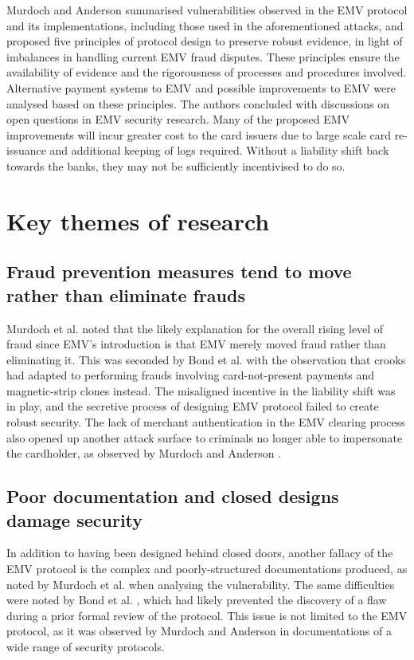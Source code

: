 \documentclass[11pt]{article}
\begin{document}
Murdoch and Anderson \cite{murdoch2014security} summarised vulnerabilities observed in the EMV protocol and its implementations, including those used in the aforementioned attacks, and proposed five principles of protocol design to preserve robust evidence, in light of imbalances in handling current EMV fraud disputes. These principles ensure the availability of evidence and the rigorousness of processes and procedures involved. Alternative payment systems to EMV and possible improvements to EMV were analysed based on these principles. The authors concluded with discussions on open questions in EMV security research. Many of the proposed EMV improvements will incur greater cost to the card issuers due to large scale card re-issuance and additional keeping of logs required. Without a liability shift back towards the banks, they may not be sufficiently incentivised to do so. 

\section{Key themes of research}

\subsection{Fraud prevention measures tend to move rather than eliminate frauds}

Murdoch et al. \cite[p. 433]{murdoch2010chip} noted that the likely explanation for the overall rising level of fraud since EMV's introduction is that EMV merely moved fraud rather than eliminating it. This was seconded by Bond et al. \cite[Sec. II]{bond2014chip} with the observation that crooks had adapted to performing frauds involving card-not-present payments and magnetic-strip clones instead. The misaligned incentive in the liability shift was in play, and the secretive process of designing EMV protocol failed to create robust security. The lack of merchant authentication in the EMV clearing process also opened up another attack surface to criminals no longer able to impersonate the cardholder, as observed by Murdoch and Anderson \cite[p. 3]{murdoch2014security}.

\subsection{Poor documentation and closed designs damage security}

In addition to having been designed behind closed doors, another fallacy of the EMV protocol is the complex and poorly-structured documentations produced, as noted by Murdoch et al. \cite[p. 439]{murdoch2010chip} when analysing the vulnerability. The same difficulties were noted by Bond et al. \cite[Sec. VI]{bond2014chip}, which had likely prevented the discovery of a flaw during a prior formal review of the protocol. This issue is not limited to the EMV protocol, as it was observed by Murdoch and Anderson \cite[p. 4]{murdoch2014security} in documentations of a wide range of security protocols.
\end{document}
